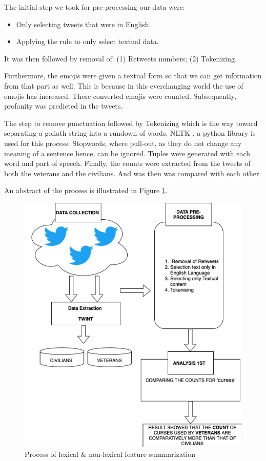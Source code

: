 The initial step we took for pre-processing our data were:

\begin{itemize}
  \item Only selecting tweets that were in English.
  \item Applying the rule to only select textual data.
\end{itemize}

It was then followed by removal of: (1) Retweets numbers; (2) Tokenizing.

Furthermore, the emojis were given a textual form so that we can get information from that part as well. This is because in this everchanging world the use of emojis has increased. These converted emojis were counted. Subsequently, profanity was predicted in the tweets.

The step to remove punctuation followed by Tokenizing which is the way toward separating a goliath string into a rundown of words. NLTK \citep{NLTK}, a python library is used for this process. Stopwords, where pull-out, as they do not change any meaning of a sentence hence, can be ignored. Tuples were generated with each word and part of speech. Finally, the counts were extracted from the tweets of both the veterans and the civilians. And was then was compared with each other.

An abstract of the process is illustrated in Figure \ref{fig:exp1}.

\begin{figure}[h]
  \centering
  \includegraphics{images/exp1process.png}
  \caption{Process of lexical \& non-lexical feature summarization}
  \label{fig:exp1}
\end{figure}

